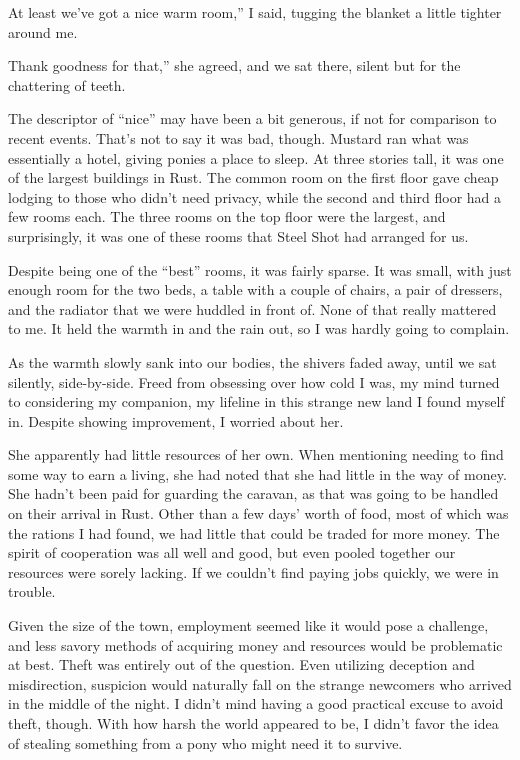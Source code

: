 \leavevmode{}At least we’ve got a nice warm room,” I said, tugging the blanket a little tighter around me.

\leavevmode{}Thank goodness for that,” she agreed, and we sat there, silent but for the chattering of teeth.

The descriptor of “nice” may have been a bit generous, if not for comparison to recent events. That’s not to say it was bad, though. Mustard ran what was essentially a hotel, giving ponies a place to sleep. At three stories tall, it was one of the largest buildings in Rust. The common room on the first floor gave cheap lodging to those who didn’t need privacy, while the second and third floor had a few rooms each. The three rooms on the top floor were the largest, and surprisingly, it was one of these rooms that Steel Shot had arranged for us.

Despite being one of the “best” rooms, it was fairly sparse. It was small, with just enough room for the two beds, a table with a couple of chairs, a pair of dressers, and the radiator that we were huddled in front of. None of that really mattered to me. It held the warmth in and the rain out, so I was hardly going to complain.

As the warmth slowly sank into our bodies, the shivers faded away, until we sat silently, side-by-side. Freed from obsessing over how cold I was, my mind turned to considering my companion, my lifeline in this strange new land I found myself in. Despite showing improvement, I worried about her.

She apparently had little resources of her own. When mentioning needing to find some way to earn a living, she had noted that she had little in the way of money. She hadn’t been paid for guarding the caravan, as that was going to be handled on their arrival in Rust. Other than a few days' worth of food, most of which was the rations I had found, we had little that could be traded for more money. The spirit of cooperation was all well and good, but even pooled together our resources were sorely lacking. If we couldn’t find paying jobs quickly, we were in trouble.

Given the size of the town, employment seemed like it would pose a challenge, and less savory methods of acquiring money and resources would be problematic at best. Theft was entirely out of the question. Even utilizing deception and misdirection, suspicion would naturally fall on the strange newcomers who arrived in the middle of the night. I didn’t mind having a good practical excuse to avoid theft, though. With how harsh the world appeared to be, I didn’t favor the idea of stealing something from a pony who might need it to survive.


